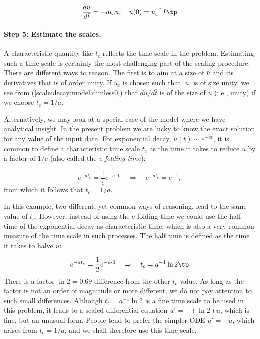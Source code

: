 \documentclass[graybox,envcountchap,sectrefs,final]{svmonodo}
\begin{document}
\begin{equation}
\frac{d\bar u}{d\bar t} = -at_c\bar u,\quad \bar u(0)=u_c^{-1}I
\tp
\label{scale:decay:model:dimless0}
\end{equation}

\paragraph{Step 5: Estimate the scales.}
A characteristic quantity like $t_c$ reflects the time scale in the
problem. Estimating such a time scale is certainly
the most challenging part of the scaling procedure. There are different
ways to reason. The first is to aim at a size of $\bar u$ and its derivatives
that is of order unity. If $u_c$ is chosen such that $|\bar u|$ is
of size unity, we see from (\ref{scale:decay:model:dimless0}) that
$d\bar u/d\bar t$ is of the size of $\bar u$ (i.e., unity)
if we choose $t_c = 1/a$.


Alternatively, we may look at a special case of the model where we have
analytical insight. In the present problem we are lucky to know the
exact solution for any value of the input data. For exponential
decay, $u(t)\sim e^{-at}$, it is common to define a characteristic time
scale $t_c$ as the time it takes to reduce $u$ by a factor of $1/e$ (also
called the \emph{e-folding time}):

\[ e^{-at_c} = \frac{1}{e}e^{-a\cdot 0}\quad\Rightarrow\quad e^{-at_c}=e^{-1},
\]
from which it follows that $t_c = 1/a$.

In this example, two different, yet common ways of reasoning, lead to the
same value of $t_c$. However, instead of using the e-folding time we
could use the half-time of the exponential decay as characteristic
time, which is also a very common measure of the time scale in such
processes. The half time is defined as the time it takes to halve $u$:

\[ e^{-at_c} = \frac{1}{2}e^{-a\cdot 0}
\quad\Rightarrow\quad t_c = a^{-1}\ln 2\tp\]
There is a factor $\ln 2 =0.69$ difference from the other $t_c$ value.
As long as the factor is not an order of magnitude or more different,
we do not pay attention to such small differences.
Although $t_c = a^{-1}\ln 2$ is a fine time scale to be used in this
problem, it leads to a scaled differential equation $u'=-(\ln 2) u$,
which is fine, but an unusual form. People tend to prefer the simpler
ODE $u'=-u$,
which arises from $t_c=1/a$, and we shall therefore use this
time scale.
\end{document}
